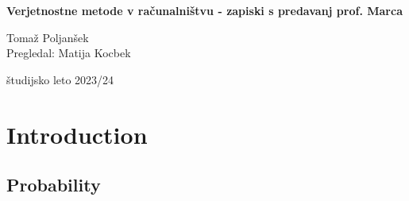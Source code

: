 \documentclass[a4paper, 12pt]{book}
\title{\ttitle}
\author{\tauthor}
\date{\tdate}
\newcommand{\ttitle}{Verjetnostne metode v računalništvu - zapiski s predavanj prof. Marca}
\newcommand{\tauthor}{Tomaž Poljanšek\\Pregledal: Matija Kocbek}
\newcommand{\tdate}{študijsko leto 2023/24}
\theoremstyle{definition}
\theoremstyle{remark}
\newcommand\mymaketitle{
  \begin{titlepage}
    \begin{center}
        \vspace*{4cm}
        \Huge
        \textbf{\ttitle}
                        
        \vspace{1.5cm}
        \huge
        \tauthor
            
        \vspace{3cm}
        \Large
        \tdate
    \end{center}
  \end{titlepage}
}
\begin{document}
\renewcommand{\thepage}{}
\newcommand{\sn}[1]{"`#1"'}

\mymaketitle

\clearpage

\frontmatter

\pagestyle{empty}
\def\thepage{}
\tableofcontents{}

\def\x{\hspace{3ex}}    %
\def\y{\hspace{2.45ex}}  %
\def\z{\hspace{1.9ex}}    %
\stackMath





\mainmatter
\setcounter{page}{1}
\pagestyle{fancy}




\chapter{Introduction}


\section{Probability}
\end{document}
